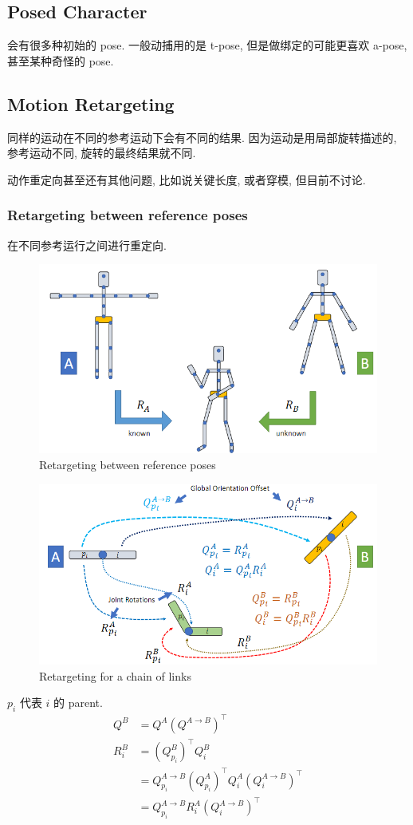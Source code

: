\subsection{Posed Character}
会有很多种初始的 pose. 一般动捕用的是 t-pose, 但是做绑定的可能更喜欢 a-pose, 甚至某种奇怪的 pose. 


\subsection{Motion Retargeting}
同样的运动在不同的参考运动下会有不同的结果. 因为运动是用局部旋转描述的, 参考运动不同, 旋转的最终结果就不同. 

动作重定向甚至还有其他问题, 比如说关键长度, 或者穿模, 但目前不讨论. 

\subsubsection{Retargeting between reference poses}
在不同参考运行之间进行重定向. 

\begin{figure}[!htb]
    \centering
    \includegraphics[width=0.618\linewidth]{pic/1053/Retargeting between reference poses}
    \caption{Retargeting between reference poses}
\end{figure}

\begin{figure}[!htb]
    \centering
    \includegraphics[width=0.88\linewidth]{pic/1053/Retargeting for a chain of links}
    \caption{Retargeting for a chain of links}
\end{figure}

$p_i$ 代表 $i$ 的 parent.
\begin{align*}
    Q^B&=Q^A(Q^{A\to B})^\top\\ 
    R_i^B &= (Q_{p_i}^B)^\top Q_i^B \\
    &= Q_{p_i}^{A\to B}(Q_{p_i}^A)^\top Q_i^A (Q_i^{A\to B})^\top \\
    &= Q_{p_i}^{A\to B}R_i^A(Q_i^{A\to B})^\top
\end{align*}



